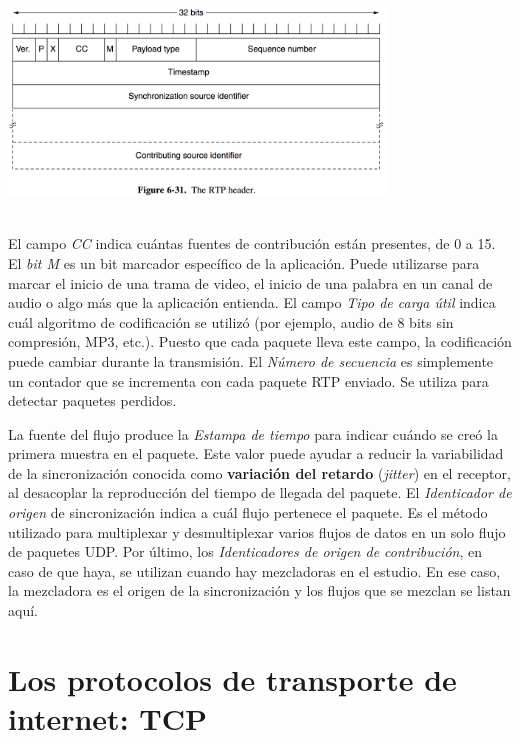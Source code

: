 \documentclass[10pt,a4paper]{report}
\begin{document}
	\begin{center}
		\includegraphics[width=10cm, height=6cm]{./imagenes/rt.png} 
	\end{center}

	\par El campo \textit{ CC} indica cuántas fuentes de contribución están presentes, de 0 a 15. El \textit{bit M} es un bit marcador específico de la aplicación. Puede utilizarse para marcar el inicio de una trama de video, el inicio de una palabra en un canal de audio o algo más que la aplicación entienda. El campo \textit{Tipo de carga útil} indica cuál algoritmo de codificación se utilizó (por ejemplo, audio de 8 bits sin compresión, MP3, etc.). Puesto que cada paquete lleva este campo, la codificación puede cambiar durante la transmisión. El \textit{Número de secuencia} es simplemente un contador que se incrementa con cada paquete RTP enviado. Se utiliza para detectar paquetes perdidos.
	
	\par La fuente del flujo produce la \textit{Estampa de tiempo} para indicar cuándo se creó la primera muestra en el paquete. Este valor puede ayudar a reducir la variabilidad de la sincronización conocida como \textbf{variación del retardo} (\textit{jitter}) en el receptor, al desacoplar la reproducción del tiempo de llegada del paquete. El \textit{Identicador de origen} de sincronización indica a cuál flujo pertenece el paquete. Es el método utilizado para multiplexar y desmultiplexar varios flujos de datos en un solo flujo de paquetes UDP. Por último, los \textit{Identicadores de origen de contribución}, en caso de que haya, se utilizan cuando hay mezcladoras en el estudio. En ese caso, la mezcladora es el origen de la sincronización y los flujos que se mezclan se listan aquí.

\section{Los protocolos de transporte de internet: TCP}
\end{document}
